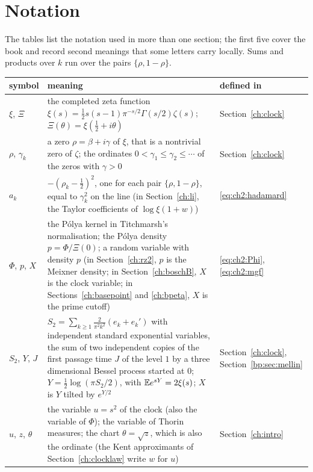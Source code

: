 \chapter{Notation}

The tables list the notation used in more than one section; the first five cover the book and record second meanings that some letters carry locally. Sums and products over $k$ run over the pairs $\{\rho,1-\rho\}$.

{\small
\begin{longtable}{@{}p{}p{}p{}@{}}
\toprule
symbol & meaning & defined in\\
\midrule
\endhead
$\xi$, $\Xi$ & \raggedright the completed zeta function ${\xi(s)=\frac12s(s-1)\pi^{-s/2}\Gamma(s/2)\zeta(s)}$; $\Xi(\theta)=\xi(\frac12+i\theta)$ & \raggedright Section~\ref{ch:clock}\tabularnewline
$\rho$, $\gamma_k$ & \raggedright a zero $\rho=\beta+i\gamma$ of $\xi$, that is a nontrivial zero of $\zeta$; the ordinates ${0<\gamma_1\le\gamma_2\le\cdots}$ of the zeros with $\gamma>0$ & \raggedright Section~\ref{ch:clock}\tabularnewline
$a_k$ & \raggedright $-(\rho_k-\frac12)^2$, one for each pair $\{\rho,1-\rho\}$, equal to $\gamma_k^2$ on the line (in Section~\ref{ch:li}, the Taylor coefficients of $\log\xi(1+w)$) & \raggedright \eqref{eq:ch2:hadamard}\tabularnewline
$\Phi$, $p$, $X$ & \raggedright the P\'olya kernel in Titchmarsh's normalisation; the P\'olya density ${p=\Phi/\Xi(0)}$; a random variable with density $p$ (in Section~\ref{ch:rz2}, $p$ is the Meixner density; in Section~\ref{ch:boschB}, $X$ is the clock variable; in Sections~\ref{ch:basepoint} and \ref{ch:bpeta}, $X$ is the prime cutoff) & \raggedright \eqref{eq:ch2:Phi}, \eqref{eq:ch2:mgf}\tabularnewline
$S_2$, $Y$, $J$ & \raggedright ${S_2=\sum_{k\ge1}\frac2{\pi^2k^2}(e_k+e_k')}$ with independent standard exponential variables, the sum of two independent copies of the first passage time $J$ of the level $1$ by a three dimensional Bessel process started at $0$; ${Y=\frac12\log(\pi S_2/2)}$, with ${\mathbb{E} e^{sY}=2\xi(s)}$; $X$ is $Y$ tilted by $e^{Y/2}$ & \raggedright Section~\ref{ch:clock}, Section~\ref{bp:sec:mellin}\tabularnewline
$u$, $z$, $\theta$ & \raggedright the variable $u=s^2$ of the clock (also the variable of $\Phi$); the variable of Thorin measures; the chart $\theta=\sqrt z$, which is also the ordinate (the Kent approximants of Section~\ref{ch:clocklaw} write $w$ for $u$) & \raggedright Section~\ref{ch:intro}\tabularnewline

\end{longtable}}
